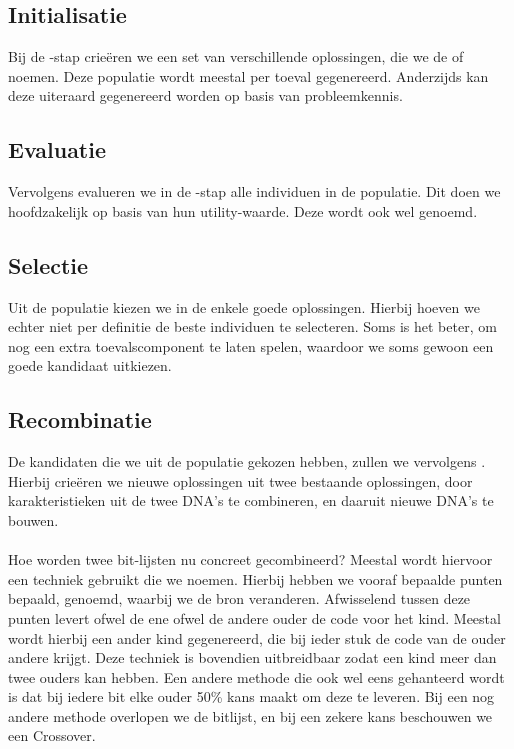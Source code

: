 \subsection{Initialisatie} Bij de -stap crie\"eren we een set van verschillende oplossingen, die we de  of  noemen. Deze populatie wordt meestal per toeval gegenereerd. Anderzijds kan deze uiteraard gegenereerd worden op basis van probleemkennis.
\subsection{Evaluatie}Vervolgens evalueren we in de -stap alle individuen in de populatie. Dit doen we hoofdzakelijk op basis van hun utility-waarde. Deze wordt ook wel  genoemd.
\subsection{Selectie}Uit de populatie kiezen we in de  enkele goede oplossingen. Hierbij hoeven we echter niet per definitie de beste individuen te selecteren. Soms is het beter, om nog een extra toevalscomponent te laten spelen, waardoor we soms gewoon een goede kandidaat uitkiezen.
\subsection{Recombinatie}De kandidaten die we uit de populatie gekozen hebben, zullen we vervolgens . Hierbij crie\"eren we nieuwe oplossingen uit twee bestaande oplossingen, door karakteristieken uit de twee DNA's te combineren, en daaruit nieuwe DNA's te bouwen.
\paragraph{}
Hoe worden twee bit-lijsten nu concreet gecombineerd? Meestal wordt hiervoor een techniek gebruikt die we  noemen. Hierbij hebben we vooraf bepaalde punten bepaald,  genoemd, waarbij we de bron veranderen. Afwisselend tussen deze punten levert ofwel de ene ofwel de andere ouder de code voor het kind. Meestal wordt hierbij een ander kind gegenereerd, die bij ieder stuk de code van de ouder andere krijgt. Deze techniek is bovendien uitbreidbaar zodat een kind meer dan twee ouders kan hebben. Een andere methode die ook wel eens gehanteerd wordt is dat bij iedere bit elke ouder 50\% kans maakt om deze te leveren. Bij een nog andere methode overlopen we de bitlijst, en bij een zekere kans beschouwen we een Crossover.
